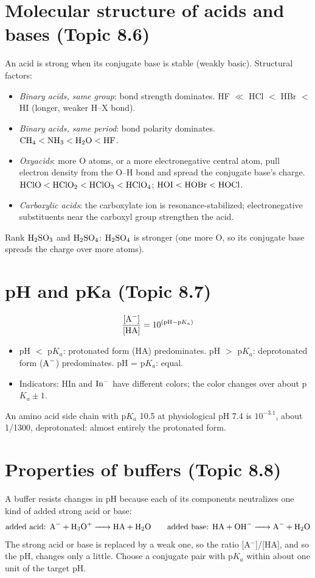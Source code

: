 \documentclass[11pt]{article}
\begin{document}
\section{Molecular structure of acids and bases (Topic 8.6)}\label{t:8.6}
An acid is strong when its conjugate base is stable (weakly basic). Structural factors:
\begin{itemize}
\item \emph{Binary acids, same group}: bond strength dominates. HF $\ll$ HCl $<$ HBr $<$ HI (longer, weaker H--X bond).
\item \emph{Binary acids, same period}: bond polarity dominates. $\ce{CH4} < \ce{NH3} < \ce{H2O} < \ce{HF}$.
\item \emph{Oxyacids}: more O atoms, or a more electronegative central atom, pull electron density from the O--H bond and spread the conjugate base's charge. $\ce{HClO} < \ce{HClO2} < \ce{HClO3} < \ce{HClO4}$; $\ce{HOI} < \ce{HOBr} < \ce{HOCl}$.
\item \emph{Carboxylic acids}: the carboxylate ion is resonance-stabilized; electronegative substituents near the carboxyl group strengthen the acid.
\end{itemize}
 Rank $\ce{H2SO3}$ and $\ce{H2SO4}$: $\ce{H2SO4}$ is stronger (one more O, so its conjugate base spreads the charge over more atoms).

\section{pH and pKa (Topic 8.7)}\label{t:8.7}
\[ \frac{[\ce{A-}]}{[\ce{HA}]} = 10^{(\text{pH} - \text{p}K_a)} \]
\begin{itemize}
\item pH $<$ p$K_a$: protonated form (HA) predominates. pH $>$ p$K_a$: deprotonated form ($\ce{A-}$) predominates. pH = p$K_a$: equal.
\item Indicators: HIn and $\ce{In-}$ have different colors; the color changes over about p$K_a \pm 1$.
\end{itemize}
 An amino acid side chain with p$K_a$ 10.5 at physiological pH 7.4 is $10^{-3.1}$, about 1/1300, deprotonated: almost entirely the protonated form.

\section{Properties of buffers (Topic 8.8)}\label{t:8.8}
A buffer resists changes in pH because each of its components neutralizes one kind of added strong acid or base:
\[ \text{added acid: } \ce{A- + H3O+ -> HA + H2O} \qquad \text{added base: } \ce{HA + OH- -> A- + H2O} \]
The strong acid or base is replaced by a weak one, so the ratio [A$^-$]/[HA], and so the pH, changes only a little. Choose a conjugate pair with p$K_a$ within about one unit of the target pH.
\end{document}
